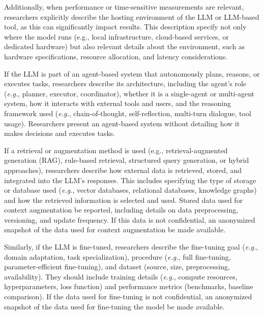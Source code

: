 Additionally, when performance or time-sensitive measurements are relevant, researchers \should explicitly describe the hosting environment of the LLM or LLM-based tool, as this can significantly impact results. This description \should specify not only where the model runs (e.g., local infrastructure, cloud-based services, or dedicated hardware) but also relevant details about the environment, such as hardware specifications, resource allocation, and latency considerations.


If the LLM is part of an agent-based system that autonomously plans, reasons, or executes tasks, researchers \must describe its architecture, including the agent's role (\textit{e.g.}, planner, executor, coordinator), whether it is a single-agent or multi-agent system, how it interacts with external tools and users, and the reasoning framework used (\textit{e.g.}, chain-of-thought, self-reflection, multi-turn dialogue, tool usage). Researchers \mustnot present an agent-based system without detailing how it makes decisions and executes tasks.


If a retrieval or augmentation method is used (e.g., retrieval-augmented generation (RAG), rule-based retrieval, structured query generation, or hybrid approaches), researchers \must describe how external data is retrieved, stored, and integrated into the LLM's responses. This includes specifying the type of storage or database used (\textit{e.g.}, vector databases, relational databases, knowledge graphs) and how the retrieved information is selected and used. Stored data used for context augmentation \must be reported, including details on data preprocessing, versioning, and update frequency. If this data is not confidential, an anonymized snapshot of the data used for context augmentation \should be made available.

Similarly, if the LLM is fine-tuned, researchers \must describe the fine-tuning goal (\textit{e.g.}, domain adaptation, task specialization), procedure (\textit{e.g.}, full fine-tuning, parameter-efficient fine-tuning), and dataset (source, size, preprocessing, availability). They should include training details (\textit{e.g.}, compute resources, hyperparameters, loss function) and performance metrics (benchmarks, baseline comparison). If the data used for fine-tuning is not confidential, an anonymized snapshot of the data used for fine-tuning the model \should be made available.

